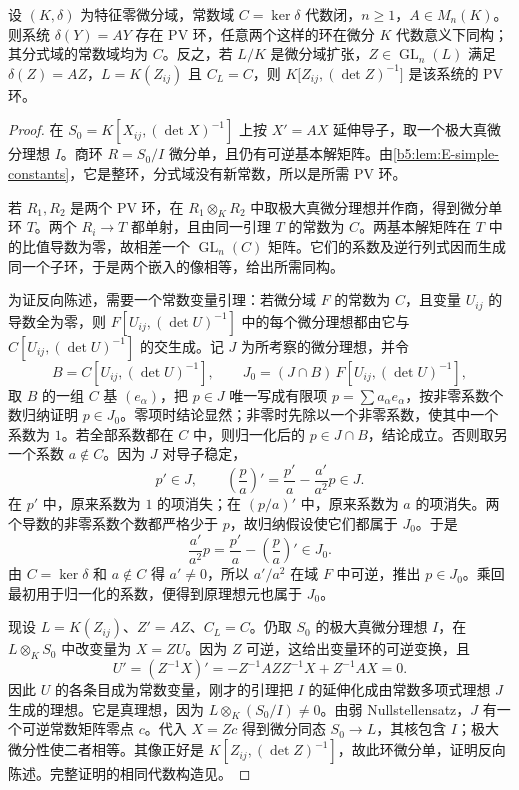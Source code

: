 \begin{theorem}\label{b5:thm:E-pv-existence}
	设 \((K,\delta)\) 为特征零微分域，常数域 \(C=\ker\delta\) 代数闭，\(n\ge1\)，\(A\in M_n(K)\)。则系统 \(\delta(Y)=AY\) 存在 PV 环，任意两个这样的环在微分 \(K\) 代数意义下同构；其分式域的常数域均为 \(C\)。反之，若 \(L/K\) 是微分域扩张，\(Z\in\operatorname{GL}_n(L)\) 满足 \(\delta(Z)=AZ\)，\(L=K(Z_{ij})\) 且 \(C_L=C\)，则 \(K\bigl[Z_{ij},(\det Z)^{-1}\bigr]\) 是该系统的 PV 环。
\end{theorem}

\begin{proof}
	在 \(S_0=K[X_{ij},(\det X)^{-1}]\) 上按 \(X'=AX\) 延伸导子，取一个极大真微分理想 \(I\)。商环 \(R=S_0/I\) 微分单，且仍有可逆基本解矩阵。由\cref{b5:lem:E-simple-constants}，它是整环，分式域没有新常数，所以是所需 PV 环。

	若 \(R_1,R_2\) 是两个 PV 环，在 \(R_1\otimes_KR_2\) 中取极大真微分理想并作商，得到微分单环 \(T\)。两个 \(R_i\to T\) 都单射，且由同一引理 \(T\) 的常数为 \(C\)。两基本解矩阵在 \(T\) 中的比值导数为零，故相差一个 \(\operatorname{GL}_n(C)\) 矩阵。它们的系数及逆行列式因而生成同一个子环，于是两个嵌入的像相等，给出所需同构。

	为证反向陈述，需要一个常数变量引理：若微分域 \(F\) 的常数为 \(C\)，且变量 \(U_{ij}\) 的导数全为零，则 \(F[U_{ij},(\det U)^{-1}]\) 中的每个微分理想都由它与 \(C[U_{ij},(\det U)^{-1}]\) 的交生成。记 \(J\) 为所考察的微分理想，并令
	\[
		B=C[U_{ij},(\det U)^{-1}],\qquad J_0=(J\cap B)\,F[U_{ij},(\det U)^{-1}],
	\]
	取 \(B\) 的一组 \(C\) 基 \((e_\alpha)\)，把 \(p\in J\) 唯一写成有限项 \(p=\sum a_\alpha e_\alpha\)，按非零系数个数归纳证明 \(p\in J_0\)。零项时结论显然；非零时先除以一个非零系数，使其中一个系数为 \(1\)。若全部系数都在 \(C\) 中，则归一化后的 \(p\in J\cap B\)，结论成立。否则取另一个系数 \(a\notin C\)。因为 \(J\) 对导子稳定，
	\[
		p'\in J,\qquad \left(\frac pa\right)'=\frac{p'}a-\frac{a'}{a^2}p\in J.
	\]
	在 \(p'\) 中，原来系数为 \(1\) 的项消失；在 \((p/a)'\) 中，原来系数为 \(a\) 的项消失。两个导数的非零系数个数都严格少于 \(p\)，故归纳假设使它们都属于 \(J_0\)。于是
	\[
		\frac{a'}{a^2}p=\frac{p'}a-\left(\frac pa\right)'\in J_0.
	\]
	由 \(C=\ker\delta\) 和 \(a\notin C\) 得 \(a'\ne0\)，所以 \(a'/a^2\) 在域 \(F\) 中可逆，推出 \(p\in J_0\)。乘回最初用于归一化的系数，便得到原理想元也属于 \(J_0\)。

	现设 \(L=K(Z_{ij})\)、\(Z'=AZ\)、\(C_L=C\)。仍取 \(S_0\) 的极大真微分理想 \(I\)，在 \(L\otimes_KS_0\) 中改变量为 \(X=ZU\)。因为 \(Z\) 可逆，这给出变量环的可逆变换，且
	\[
		U'=(Z^{-1}X)'=-Z^{-1}AZZ^{-1}X+Z^{-1}AX=0.
	\]
	因此 \(U\) 的各条目成为常数变量，刚才的引理把 \(I\) 的延伸化成由常数多项式理想 \(J\) 生成的理想。它是真理想，因为 \(L\otimes_K(S_0/I)\ne0\)。由弱 Nullstellensatz，\(J\) 有一个可逆常数矩阵零点 \(c\)。代入 \(X=Zc\) 得到微分同态 \(S_0\to L\)，其核包含 \(I\)；极大微分性使二者相等。其像正好是 \(K[Z_{ij},(\det Z)^{-1}]\)，故此环微分单，证明反向陈述。完整证明的相同代数构造见\cite[Section 1.3, Lemmas 1.17 and 1.23, Propositions 1.20 and 1.22]{VanDerPutSinger2003GaloisTheory}。
\end{proof}


